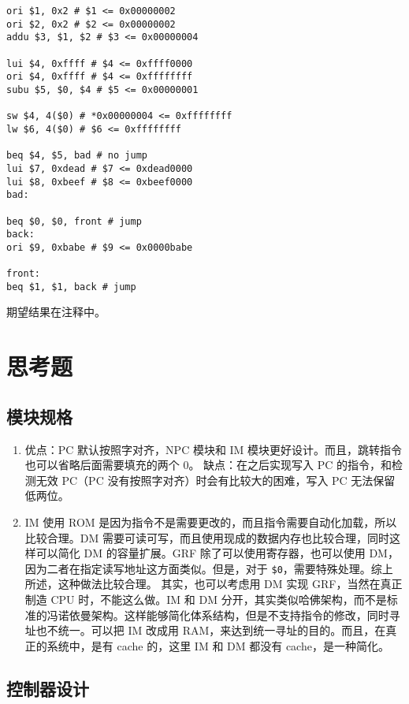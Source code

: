 \documentclass[12pt,AutoFakeBold]{article}
\begin{document}
\begin{lstlisting}[language={[mips]Assembler}]
ori $1, 0x2 # $1 <= 0x00000002
ori $2, 0x2 # $2 <= 0x00000002
addu $3, $1, $2 # $3 <= 0x00000004

lui $4, 0xffff # $4 <= 0xffff0000
ori $4, 0xffff # $4 <= 0xffffffff
subu $5, $0, $4 # $5 <= 0x00000001

sw $4, 4($0) # *0x00000004 <= 0xffffffff
lw $6, 4($0) # $6 <= 0xffffffff

beq $4, $5, bad # no jump
lui $7, 0xdead # $7 <= 0xdead0000
lui $8, 0xbeef # $8 <= 0xbeef0000
bad:

beq $0, $0, front # jump
back:
ori $9, 0xbabe # $9 <= 0x0000babe

front:
beq $1, $1, back # jump
\end{lstlisting}

期望结果在注释中。

\section{思考题}

\subsection{模块规格}

\begin{enumerate}
\item 优点：PC 默认按照字对齐，NPC 模块和 IM 模块更好设计。而且，跳转指令也可以省略后面需要填充的两个 0。\newline
缺点：在之后实现写入 PC 的指令，和检测无效 PC（PC 没有按照字对齐）时会有比较大的困难，写入 PC 无法保留低两位。
\item IM 使用 ROM 是因为指令不是需要更改的，而且指令需要自动化加载，所以比较合理。DM 需要可读可写，而且使用现成的数据内存也比较合理，同时这样可以简化 DM 的容量扩展。GRF 除了可以使用寄存器，也可以使用 DM，因为二者在指定读写地址这方面类似。但是，对于 \texttt{\${}0}，需要特殊处理。综上所述，这种做法比较合理。\newline
其实，也可以考虑用 DM 实现 GRF，当然在真正制造 CPU 时，不能这么做。IM 和 DM 分开，其实类似哈佛架构，而不是标准的冯诺依曼架构。这样能够简化体系结构，但是不支持指令的修改，同时寻址也不统一。可以把 IM 改成用 RAM，来达到统一寻址的目的。而且，在真正的系统中，是有 cache 的，这里 IM 和 DM 都没有 cache，是一种简化。
\end{enumerate}

\subsection{控制器设计}
\end{document}

